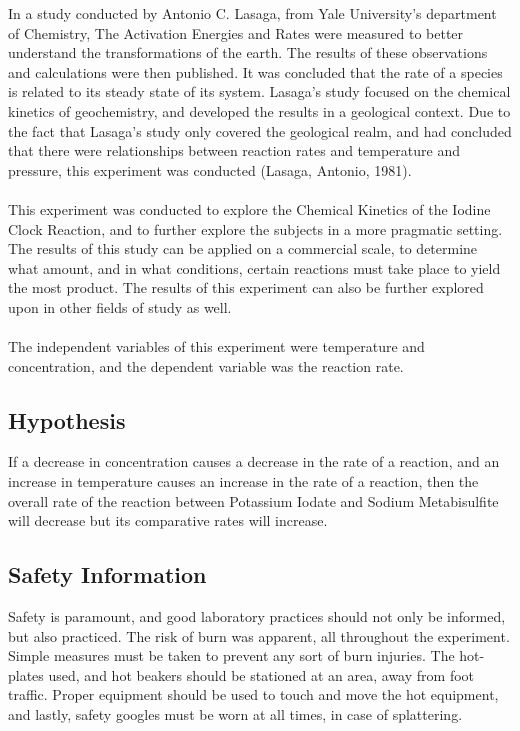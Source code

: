 \documentclass{article}
\begin{document}
In a study conducted by Antonio C. Lasaga, from Yale University's department of Chemistry, The Activation Energies and Rates were measured to better understand the transformations of the earth. The results of these observations and calculations were then published. It was concluded that the rate of a species is related to its steady state of its system. Lasaga's study focused on the chemical kinetics of geochemistry, and developed the results in a geological context. Due to the fact that Lasaga's study only covered the geological realm, and had concluded that there were relationships between reaction rates and temperature and pressure, this experiment was conducted (Lasaga, Antonio, 1981). \\\\
This experiment was conducted to explore the Chemical Kinetics of the Iodine Clock Reaction, and to further explore the subjects in a more pragmatic setting. The results of this study can be applied on a commercial scale, to determine what amount, and in what conditions, certain reactions must take place to yield the most product. The results of this experiment can also be further explored upon in other fields of study as well. \\\\
The independent variables of this experiment were temperature and concentration, and the dependent variable was the reaction rate. 
\subsection*{Hypothesis}%
If a decrease in concentration causes a decrease in the rate of a reaction, and an increase in temperature causes an increase in the rate of a reaction, then the overall rate of the reaction between Potassium Iodate and Sodium Metabisulfite will decrease but its comparative rates will increase. 
\subsection*{Safety Information}%
Safety is paramount, and good laboratory practices should not only be informed, but also practiced. The risk of burn was apparent, all throughout the experiment. Simple measures must be taken to prevent any sort of burn injuries. The hot-plates used, and hot beakers should be stationed at an area, away from foot traffic. Proper equipment should be used to touch and move the hot equipment, and lastly, safety googles must be worn at all times, in case of splattering.
\end{document}
